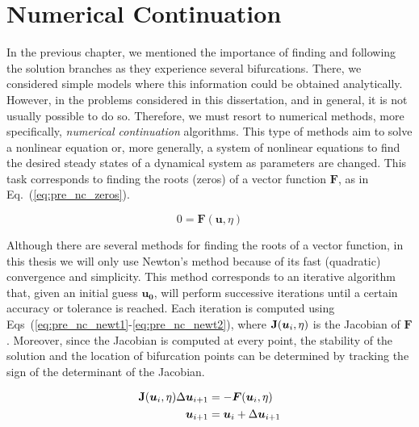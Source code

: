 \chapter{Numerical Continuation}

In the previous chapter, we mentioned the importance of finding and following
the solution branches as they experience several bifurcations. There, we considered simple
models where this information could be obtained analytically. However, in the problems considered
in this dissertation, and in general, it is not usually possible to do so. Therefore,
we must resort to numerical methods, more specifically, 
{\em numerical continuation} algorithms. This type of methods
aim to solve a nonlinear equation or, more generally, a system of nonlinear 
equations to find the desired steady states of a dynamical system 
as parameters are changed. This task corresponds to finding the roots 
(zeros) of a vector function $\bm{F}$, as in Eq.~(\ref{eq:pre_nc_zeros}). 


\begin{equation}
    0 = \bm{F}(\bm{u}, \eta)
    \label{eq:pre_nc_zeros}
\end{equation}

Although there are several methods for finding the roots of a vector function,
in this thesis we will only use Newton's method because of its fast 
(quadratic) convergence and simplicity. This method corresponds to an 
iterative algorithm that, given an initial guess $\bm{u_0}$, will perform 
successive iterations until a certain accuracy or tolerance is reached. 
Each iteration is computed using Eqs~(\ref{eq:pre_nc_newt1}-\ref{eq:pre_nc_newt2}),
where $\mathbf{J}(\bm{u}_i, \eta)$ is the Jacobian of $\bm{F}$. 
Moreover, since the Jacobian is computed at every point, the stability 
of the solution and the location of bifurcation points can be determined
by tracking the sign of the determinant of the Jacobian.

\begin{align}
    \mathbf{J}(\bm{u}_i, \eta) \Delta \bm{u}_{i+1} &= - \bm{F}(\bm{u}_i, \eta) 
    \label{eq:pre_nc_newt1}
    \\
    \bm{u}_{i+1} &= \bm{u}_i + \Delta \bm{u}_{i+1}
    \label{eq:pre_nc_newt2}
\end{align}

